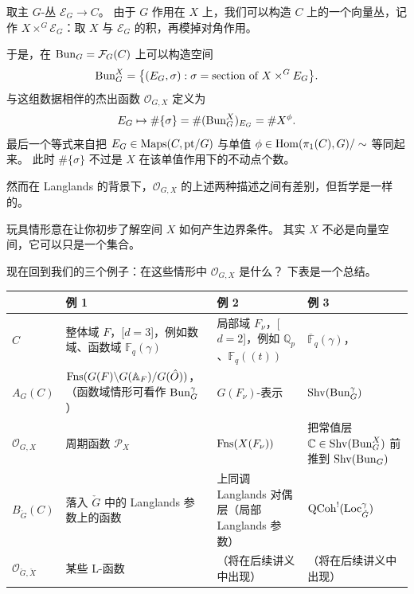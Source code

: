 取主 $G$-丛 $\mathcal E_G\to C$。
由于 $G$ 作用在 $X$ 上，我们可以构造 $C$ 上的一个向量丛，记作 $X\times^G\mathcal E_G$：取 $X$ 与 $\mathcal E_G$ 的积，再模掉对角作用。

于是，在 $\operatorname{Bun}_G=\mathcal F_G(C)$ 上可以构造空间
\[
  \operatorname{Bun}^X_G=\bigl\{(E_G,\sigma):\sigma=\text{section of }X\times^G E_G\bigr\}.
\]
与这组数据相伴的杰出函数 $\mathcal O_{G,X}$ 定义为
\[
  E_G\mapsto\#\{\sigma\}=\#(\operatorname{Bun}^X_G)_{E_G}=\#X^\phi.
\]
最后一个等式来自把 $E_G\in\operatorname{Maps}(C,\mathrm{pt}/G)$ 与单值 $\phi\in\operatorname{Hom}(\pi_1(C),G)/\sim$ 等同起来。
此时 $\#\{\sigma\}$ 不过是 $X$ 在该单值作用下的不动点个数。

然而在 Langlands 的背景下，$\mathcal O_{G,X}$ 的上述两种描述之间有差别，但哲学是一样的。

玩具情形意在让你初步了解空间 $X$ 如何产生边界条件。
其实 $X$ 不必是向量空间，它可以只是一个集合。

现在回到我们的三个例子：在这些情形中 $\mathcal O_{G,X}$ 是什么？
下表是一个总结。

\begin{center}
\scriptsize
\renewcommand{\arraystretch}{1.3}
\begin{tabular}{|p{}|p{}|p{}|p{}|}
\hline
 & 例 1 & 例 2 & 例 3\\\hline
$C$\newline[维数 $d$ 的流形]
 & 整体域 $F$，[$d=3$]，\newline 例如数域、函数域 $\mathbb F_q(\gamma)$
 & 局部域 $F_\nu$，[$d=2$]，\newline 例如 $\mathbb Q_p$、$\mathbb F_q((t))$
 & $\overline{\mathbb F}_q(\gamma)$，\newline [$d=2$]\\\hline
$A_G(C)$\newline[$(4-d-1)$-范畴]
 & $\operatorname{Fns}(G(F)\backslash G(\mathbb A_F)/G(\hat O))$，\newline（函数域情形可看作 $\operatorname{Bun}^\gamma_G$）
 & $G(F_\nu)$-表示
 & $\operatorname{Shv}(\operatorname{Bun}^\gamma_G)$\\\hline
$\mathcal O_{G,X}$
 & 周期函数 $\mathcal P_X$
 & $\operatorname{Fns}(X(F_\nu))$
 & 把常值层 $\mathbb C\in\operatorname{Shv}(\operatorname{Bun}^X_G)$ 前推到 $\operatorname{Shv}(\operatorname{Bun}_G)$\\\hline
$B_{\check G}(C)$
 & 落入 $\check G$ 中的 Langlands 参数上的函数
 & 上同调 Langlands 对偶层（局部 Langlands 参数）
 & $\operatorname{QCoh}^!(\operatorname{Loc}^\gamma_{\check G})$\\\hline
$\mathcal O_{\check G,\check X}$
 & 某些 L-函数
 & （将在后续讲义中出现）
 & （将在后续讲义中出现）\\\hline
\end{tabular}
\end{center}

